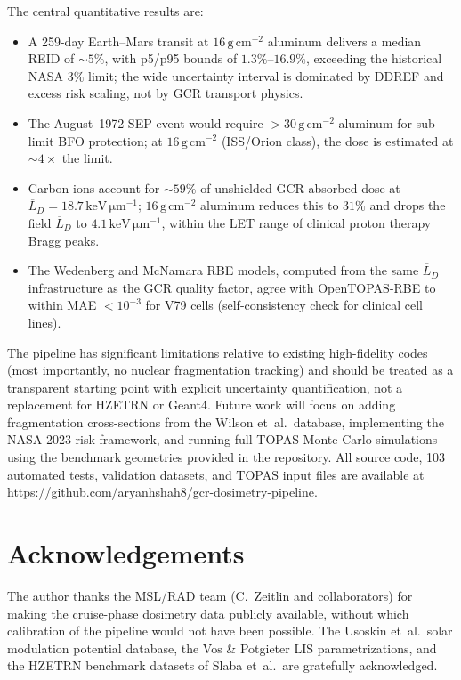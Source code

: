 \documentclass[12pt,letterpaper]{article}
\newcommand{\gcm}{\,\mathrm{g\,cm^{-2}}}
\newcommand{\keVum}{\,\mathrm{keV\,\mu m^{-1}}}
\newcommand{\LETd}{\overline{L}_D}
\begin{document}
The central quantitative results are:
\begin{itemize}
  \item A 259-day Earth--Mars transit at $16\gcm$ aluminum delivers a
        median REID of $\sim\!5\%$, with p5/p95 bounds of
        $1.3\%$--$16.9\%$, exceeding the historical NASA $3\%$ limit;
        the wide uncertainty interval is dominated by DDREF and excess
        risk scaling, not by GCR transport physics.
  \item The August~1972 SEP event would require $>30\gcm$ aluminum
        for sub-limit BFO protection; at $16\gcm$ (ISS/Orion class),
        the dose is estimated at $\sim\!4\times$ the limit.
  \item Carbon ions account for $\sim\!59\%$ of unshielded GCR absorbed dose
        at $\LETd = 18.7\keVum$; $16\gcm$ aluminum reduces this to
        $31\%$ and drops the field $\LETd$ to $4.1\keVum$, within
        the LET range of clinical proton therapy Bragg peaks.
  \item The Wedenberg and McNamara RBE models, computed from the same
        $\LETd$ infrastructure as the GCR quality factor, agree with
        OpenTOPAS-RBE to within MAE $<10^{-3}$ for V79 cells
        (self-consistency check for clinical cell lines).
\end{itemize}

The pipeline has significant limitations relative to existing high-fidelity
codes (most importantly, no nuclear fragmentation tracking) and should be
treated as a transparent starting point with explicit uncertainty
quantification, not a replacement for HZETRN or Geant4.
Future work will focus on adding fragmentation cross-sections from the
Wilson et~al.\ database, implementing the NASA 2023 risk framework,
and running full TOPAS Monte Carlo simulations using the benchmark
geometries provided in the repository.
All source code, 103 automated tests, validation datasets, and TOPAS input
files are available at \url{https://github.com/aryanhshah8/gcr-dosimetry-pipeline}.

\section*{Acknowledgements}

The author thanks the MSL/RAD team (C.~Zeitlin and collaborators) for making
the cruise-phase dosimetry data publicly available, without which calibration
of the pipeline would not have been possible.
The Usoskin et~al.\ solar modulation potential database, the Vos \&
Potgieter LIS parametrizations, and the HZETRN benchmark datasets of
Slaba et~al.\ are gratefully acknowledged.
\end{document}
